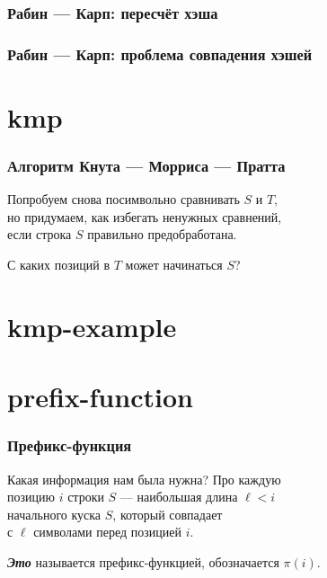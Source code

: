 \documentclass[11pt,aspectratio=169,svgnames]{beamer}
\begin{document}
\begin{frame} \frametitle{Рабин — Карп: пересчёт хэша}
  \begin{center} \begin{tikzpicture}[xscale=0.71,yscale=0.87]
    
  \end{tikzpicture} \end{center}
\end{frame}


\begin{frame} \frametitle{Рабин — Карп: проблема совпадения хэшей}
  \begin{center} \begin{tikzpicture}[xscale=0.71,yscale=0.87]
    
  \end{tikzpicture} \end{center}
\end{frame}


\section{kmp}

\begin{frame} \frametitle{Алгоритм Кнута — Морриса — Пратта}
Попробуем снова посимвольно сравнивать \(S\) и \(T\),\\
но придумаем, как избегать ненужных сравнений,\\
если строка \(S\) правильно предобработана.\bigskip \pause

С каких позиций в \(T\) может начинаться \(S\)?
\end{frame}


\section{kmp-example}




\section{prefix-function}

\begin{frame} \frametitle{Префикс-функция}
Какая информация нам была нужна? Про каждую\\
позицию \(i\) строки \(S\) — наибольшая длина \(\ell< i\)\\
начального куска \(S\), который совпадает\\
с \(\ell\) символами перед позицией \(i\). \bigskip

{\itshape\bfseries Это} называется префикс-функцией, обозначается \(π(i)\). \bigskip


\end{frame}
\end{document}
